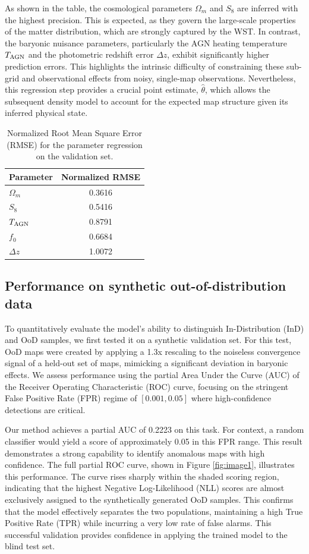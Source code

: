 \documentclass[]{article}
\begin{document}
As shown in the table, the cosmological parameters $\Omega_m$ and $S_8$ are inferred with the highest precision. This is expected, as they govern the large-scale properties of the matter distribution, which are strongly captured by the WST. In contrast, the baryonic nuisance parameters, particularly the AGN heating temperature $T_{\rm AGN}$ and the photometric redshift error $\Delta z$, exhibit significantly higher prediction errors. This highlights the intrinsic difficulty of constraining these sub-grid and observational effects from noisy, single-map observations. Nevertheless, this regression step provides a crucial point estimate, $\hat{\theta}$, which allows the subsequent density model to account for the expected map structure given its inferred physical state.

\begin{table}[h!]
\centering
\caption{Normalized Root Mean Square Error (RMSE) for the parameter regression on the validation set.}
\label{tab:rmse}
\begin{tabular}{lc}
\hline
\hline
Parameter & Normalized RMSE \\
\hline
$\Omega_m$ & 0.3616 \\
$S_8$ & 0.5416 \\
$T_{\rm AGN}$ & 0.8791 \\
$f_0$ & 0.6684 \\
$\Delta z$ & 1.0072 \\
\hline
\end{tabular}
\end{table}

\subsection{Performance on synthetic out-of-distribution data}
To quantitatively evaluate the model's ability to distinguish In-Distribution (InD) and OoD samples, we first tested it on a synthetic validation set. For this test, OoD maps were created by applying a 1.3x rescaling to the noiseless convergence signal of a held-out set of maps, mimicking a significant deviation in baryonic effects. We assess performance using the partial Area Under the Curve (AUC) of the Receiver Operating Characteristic (ROC) curve, focusing on the stringent False Positive Rate (FPR) regime of $[0.001, 0.05]$ where high-confidence detections are critical.

Our method achieves a partial AUC of 0.2223 on this task. For context, a random classifier would yield a score of approximately 0.05 in this FPR range. This result demonstrates a strong capability to identify anomalous maps with high confidence. The full partial ROC curve, shown in Figure \ref{fig:image1}, illustrates this performance. The curve rises sharply within the shaded scoring region, indicating that the highest Negative Log-Likelihood (NLL) scores are almost exclusively assigned to the synthetically generated OoD samples. This confirms that the model effectively separates the two populations, maintaining a high True Positive Rate (TPR) while incurring a very low rate of false alarms. This successful validation provides confidence in applying the trained model to the blind test set.
\end{document}
